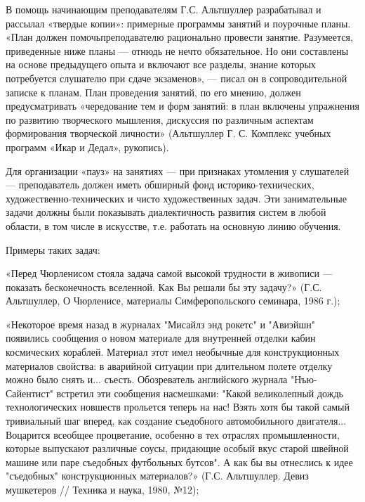 В  помощь начинающим  преподавателям  Г.С.  Альтшуллер разрабатывал  и
рассылал  «твердые копии»:  примерные  программы  занятий и  поурочные
планы. «План должен  помочьпреподавателю рационально провести занятие.
Разумеется, приведенные ниже планы —  отнюдь не нечто обязательное. Но
они составлены  на основе  предыдущего опыта  и включают  все разделы,
знание которых потребуется слушателю при  сдаче экзаменов», — писал он
в сопроводительной записке  к планам. План проведения  занятий, по его
мнению, должен предусматривать «чередование тем и форм занятий: в план
включены  упражнения по  развитию творческого  мышления, дискуссия  по
различным аспектам формирования творческой личности» (Альтшуллер Г. С.
Комплекс учебных программ «Икар и Дедал», рукопись).

Для  организации   «пауз»  на  занятиях  —   при  признаках  утомления
у   слушателей   —   преподаватель    должен   иметь   обширный   фонд
историко-технических, художественно-технических и чисто художественных
задач. Эти занимательные задачи  должны были показывать диалектичность
развития  систем  в любой  области,  в  том  числе в  искусстве,  т.е.
работать на основную линию обучения.

Примеры таких задач:

«Перед Чюрленисом стояла  задача самой высокой трудности  в живописи —
показать бесконечность вселенной. Как Вы  решали бы эту задачу?» (Г.С.
Альтшуллер,  О Чюрленисе,  материалы  Симферопольского семинара,  1986
г.);

«Некоторое время  назад в  журналах "Мисайлз  энд рокетс"  и "Авиэйшн"
появились  сообщения о  новом материале  для внутренней  отделки кабин
космических кораблей. Материал этот имел необычные для конструкционных
материалов  свойства:  в  аварийной  ситуации  при  длительном  полете
отделку можно было снять и... съесть. Обозреватель английского журнала
"Нъю-Сайентист" встретил эти сообщения насмешками: "Какой великолепный
дождь  технологических новшеств  прольется теперь  на нас!  Взять хотя
бы  такой  самый  тривиальный  шаг  вперед,  как  создание  съедобного
автомобильного двигателя...  Воцарится всеобщее  процветание, особенно
в  тех отраслях  промышленности,  которые  выпускают различные  соусы,
придающие  особый  вкус  старой  швейной  машине  или  паре  съедобных
футбольных  бутсов".  А  как  бы   вы  отнеслись  к  идее  "съедобных"
конструкционных  материалов?» (Г.С.  Альтшуллер.  Девиз мушкетеров  //
Техника и наука, 1980, №12);

